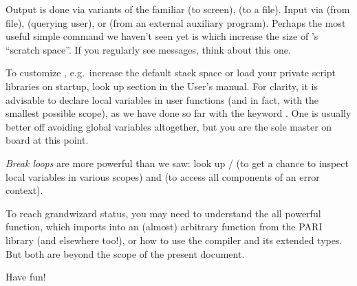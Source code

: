 Output is done via variants of the familiar  (to screen),
 (to a file). Input via  (from file), 
(querying user), or  (from an external auxiliary program).
Perhaps the most useful simple command we haven't seen yet is
 which increase the size of 's ``scratch space''. If
you regularly see  messages, think about this
one.

To customize , e.g.~increase the default stack space or load your
private script libraries on startup, look up 
section in the User's manual. For clarity, it is advisable  to declare local
variables in user functions (and in fact, with the smallest possible scope),
as we have done so far with the keyword . One is usually better off
avoiding global variables altogether, but you are the sole master on board at
this point.

\emph{Break loops} are more powerful than we saw: look up  /
 (to get a chance to inspect local variables in various scopes)
and  (to access all components of an error context).

To reach grandwizard status, you may need to understand the all powerful
 function, which imports into  an (almost) arbitrary
function from the PARI library (and elsewhere too!), or how to use the
 compiler and its extended types. But both are beyond the scope of
the present document.

Have fun!
\bye
